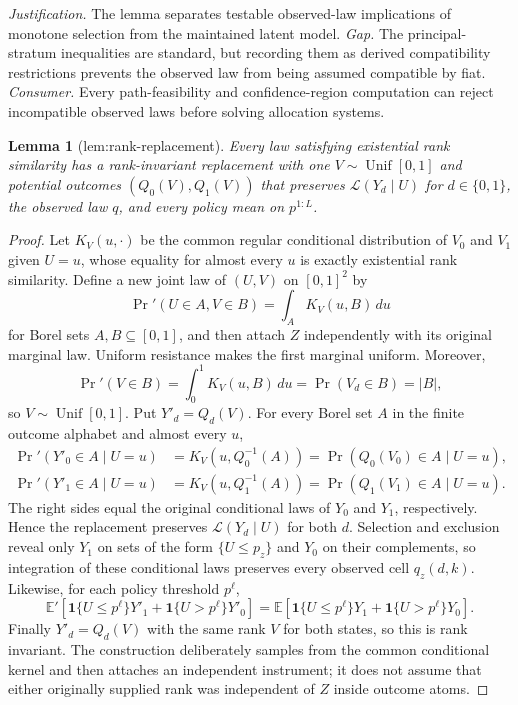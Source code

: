\documentclass{article}
\newtheorem{lemma}{Lemma}
\begin{document}
\par\smallskip\noindent \textit{Justification.} The lemma separates testable observed-law implications of monotone selection from the maintained latent model. \textit{Gap.} The principal-stratum inequalities are standard, but recording them as derived compatibility restrictions prevents the observed law from being assumed compatible by fiat. \textit{Consumer.} Every path-feasibility and confidence-region computation can reject incompatible observed laws before solving allocation systems.

\begin{lemma}[lem:rank-replacement]\label{lem:rank-replacement}
Every law satisfying existential rank similarity has a rank-invariant replacement with one \(V\sim\operatorname{Unif}[0,1]\) and potential outcomes \((Q_0(V),Q_1(V))\) that preserves \(\mathcal L(Y_d\mid U)\) for \(d\in\{0,1\}\), the observed law \(q\), and every policy mean on \(p^{1:L}\).
\end{lemma}
\begin{proof}
Let \(K_V(u,\cdot)\) be the common regular conditional distribution of \(V_0\) and \(V_1\) given \(U=u\), whose equality for almost every \(u\) is exactly existential rank similarity.  Define a new joint law of \((U,V)\) on \([0,1]^2\) by
\[
\Pr'(U\in A,V\in B)=\int_A K_V(u,B)\,du
\]
for Borel sets \(A,B\subseteq[0,1]\), and then attach \(Z\) independently with its original marginal law.  Uniform resistance makes the first marginal uniform.  Moreover,
\[
\Pr'(V\in B)=\int_0^1K_V(u,B)\,du=\Pr(V_d\in B)=|B|,
\]
so \(V\sim\operatorname{Unif}[0,1]\).  Put \(Y'_d=Q_d(V)\).  For every Borel set \(A\) in the finite outcome alphabet and almost every \(u\),
\[
\begin{aligned}
\Pr'(Y'_0\in A\mid U=u)
 &=K_V(u,Q_0^{-1}(A))
 =\Pr(Q_0(V_0)\in A\mid U=u),\\
\Pr'(Y'_1\in A\mid U=u)
 &=K_V(u,Q_1^{-1}(A))
 =\Pr(Q_1(V_1)\in A\mid U=u).
\end{aligned}
\]
The right sides equal the original conditional laws of \(Y_0\) and \(Y_1\), respectively.  Hence the replacement preserves \(\mathcal L(Y_d\mid U)\) for both \(d\).  Selection and exclusion reveal only \(Y_1\) on sets of the form \(\{U\le p_z\}\) and \(Y_0\) on their complements, so integration of these conditional laws preserves every observed cell \(q_z(d,k)\).  Likewise, for each policy threshold \(p^\ell\),
\[
\mathbb E'[\mathbf 1\{U\le p^\ell\}Y'_1+\mathbf 1\{U>p^\ell\}Y'_0]
=\mathbb E[\mathbf 1\{U\le p^\ell\}Y_1+\mathbf 1\{U>p^\ell\}Y_0].
\]
Finally \(Y'_d=Q_d(V)\) with the same rank \(V\) for both states, so this is rank invariant.  The construction deliberately samples from the common conditional kernel and then attaches an independent instrument; it does not assume that either originally supplied rank was independent of \(Z\) inside outcome atoms.
\end{proof}
\end{document}
